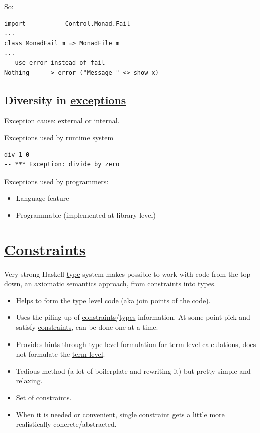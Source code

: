 \documentclass[a4paper,14pt,oneside]{book}
\begin{document}
So:
\begin{verbatim}
import           Control.Monad.Fail
...
class MonadFail m => MonadFile m
...
-- use error instead of fail
Nothing     -> error ("Message " <> show x)
\end{verbatim}

\section{Diversity in \hyperref[orgb96d5c8]{exceptions}}
\label{sec:org22edadb}

\hyperref[org7dff0cd]{Exception} cause: external or internal.

\hyperref[orgb96d5c8]{Exceptions} used by runtime system

\begin{verbatim}
div 1 0
-- *** Exception: divide by zero
\end{verbatim}

\hyperref[orgb96d5c8]{Exceptions} used by programmers:
\begin{itemize}
\item Language feature
\item Programmable (implemented at library level)
\end{itemize}

\chapter{\hyperref[org5d58d0c]{Constraints}}
\label{sec:org055969f}

Very strong Haskell \hyperref[orgad34ec6]{type} system makes possible to work with code from the top down, an \hyperref[org37b53c4]{axiomatic semantics} approach, from \hyperref[org5d58d0c]{constraints} into \hyperref[org8e179ef]{types}.

\begin{itemize}
\item Helps to form the \hyperref[orgfe87561]{type level} code (aka \hyperref[org938a4b4]{join} points of the code).
\item Uses the piling up of \hyperref[org5d58d0c]{constraints}/\hyperref[org8e179ef]{types} information. At some point pick and satisfy \hyperref[org5d58d0c]{constraints}, can be done one at a time.
\item Provides hints through \hyperref[orgfe87561]{type level} formulation for \hyperref[orgfb8ceb7]{term level} calculations, does not formulate the \hyperref[orgfb8ceb7]{term level}.
\item Tedious method (a lot of boilerplate and rewriting it) but pretty simple and relaxing.

\item \hyperref[org6837025]{Set} of \hyperref[org5d58d0c]{constraints}.

\item When it is needed or convenient, single \hyperref[org59566d4]{constraint} gets a little more realistically concrete/abstracted.
\end{itemize}
\end{document}
